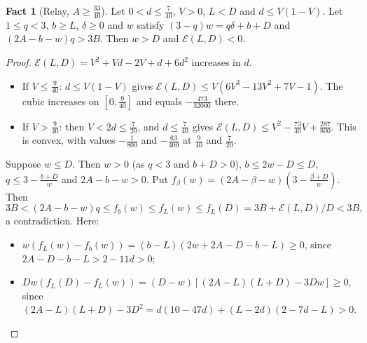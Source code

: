 \documentclass[11pt,a4paper]{article}
\numberwithin{equation}{section}
\theoremstyle{definition}
\newtheorem{fact}{Fact}
\newcommand{\cE}{\mathcal E}
\begin{document}
\begin{fact}[Relay, $A\ge\frac{33}{40}$]\label{fact:highanchor}Let $0<d\le\frac7{40}$, $V>0$, $L<D$ and $d\le V(1-V)$. Let $1\le q<3$, $b\ge L$,
$\delta\ge0$ and $w$ satisfy $(3-q)w=q\delta+b+D$ and $(2A-b-w)q>3B$. Then
$w>D$ and $\cE(L,D)<0$.
\end{fact}
\begin{proof}
$\cE(L,D)=V^2+Vd-2V+d+6d^2$ increases in $d$.
\begin{itemize}
\item If $V\le\frac9{40}$: $d\le V(1-V)$ gives
$\cE(L,D)\le V(6V^3-13V^2+7V-1)$. The cubic increases on $[0,\frac9{40}]$ and
equals $-\frac{473}{32000}$ there.
\item If $V>\frac9{40}$: then $V<2d\le\frac7{20}$, and $d\le\frac7{40}$ gives
$\cE(L,D)\le V^2-\frac{73}{40}V+\frac{287}{800}$. This is convex, with values
$-\frac1{800}$ and $-\frac{63}{400}$ at $\frac9{40}$ and $\frac7{20}$.
\end{itemize}
Suppose $w\le D$. Then $w>0$ (as $q<3$ and $b+D>0$), $b\le2w-D\le D$, $q\le3-\frac{b+D}w$ and
$2A-b-w>0$. Put $f_\beta(w)=(2A-\beta-w)(3-\frac{\beta+D}w)$. Then
\[
3B<(2A-b-w)q\le f_b(w)\le f_L(w)\le f_L(D)=3B+\cE(L,D)/D<3B,
\]
a contradiction. Here:
\begin{itemize}
\item $w(f_L(w)-f_b(w))=(b-L)(2w+2A-D-b-L)\ge0$, since $2A-D-b-L>2-11d>0$;
\item $Dw(f_L(D)-f_L(w))=(D-w)[(2A-L)(L+D)-3Dw]\ge0$, since
$(2A-L)(L+D)-3D^2=d(10-47d)+(L-2d)(2-7d-L)>0$.
\qedhere
\end{itemize}
\end{proof}
\end{document}
